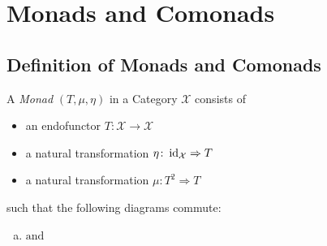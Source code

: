 \chapter{Monads and Comonads}
\section{Definition of Monads and Comonads}
\begin{definition}[Monad]
    A \textit{Monad} $(T,\mu, \eta) $ in a Category $\mathcal{X}$ consists of
    \begin{itemize}
        \item an endofunctor $T\colon \mathcal{X} \to \mathcal{X}$
        \item a natural transformation $\eta \colon \operatorname{id}_\mathcal{X} \Rightarrow T$ 
        \item a natural transformation $\mu\colon T^2 \Rightarrow T $
    \end{itemize}  
    such that the following diagrams commute:
    \begin{enumerate}[(a)]
    \item 
    \begin{minipage}{0.4\linewidth}
    \centering
    \end{minipage}
    $\mathrm{and}$
    \begin{minipage}{0.4\linewidth}
    \centering
    \end{minipage}
\end{enumerate}
\end{definition}

